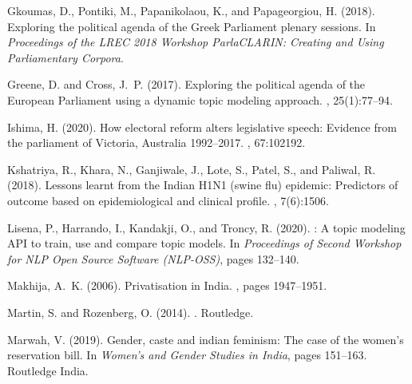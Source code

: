 \documentclass[10pt, a4paper]{article}
\begin{document}
\begin{thebibliography}{}
Gkoumas, D., Pontiki, M., Papanikolaou, K., and Papageorgiou, H.
\newblock (2018).
\newblock Exploring the political agenda of the {Greek Parliament} plenary
  sessions.
\newblock In {\em Proceedings of the LREC 2018 Workshop ParlaCLARIN: Creating
  and Using Parliamentary Corpora}.

Greene, D. and Cross, J.~P.
\newblock (2017).
\newblock Exploring the political agenda of the {European Parliament} using a
  dynamic topic modeling approach.
, 25(1):77--94.

Ishima, H.
\newblock (2020).
\newblock How electoral reform alters legislative speech: Evidence from the
  parliament of {Victoria, Australia} 1992--2017.
, 67:102192.

Kshatriya, R., Khara, N., Ganjiwale, J., Lote, S., Patel, S., and Paliwal, R.
\newblock (2018).
\newblock Lessons learnt from the {Indian H1N1} (swine flu) epidemic:
  Predictors of outcome based on epidemiological and clinical profile.
, 7(6):1506.

Lisena, P., Harrando, I., Kandakji, O., and Troncy, R.
\newblock (2020).
: A topic modeling {API} to train, use and compare topic
  models.
\newblock In {\em Proceedings of Second Workshop for NLP Open Source Software
  (NLP-OSS)}, pages 132--140.

Makhija, A.~K.
\newblock (2006).
\newblock Privatisation in {India}.
, pages 1947--1951.

Martin, S. and Rozenberg, O.
\newblock (2014).
.
\newblock Routledge.

Marwah, V.
\newblock (2019).
\newblock Gender, caste and indian feminism: The case of the women’s
  reservation bill.
\newblock In {\em Women’s and Gender Studies in India}, pages 151--163.
  Routledge India.


\end{thebibliography}
\end{document}
